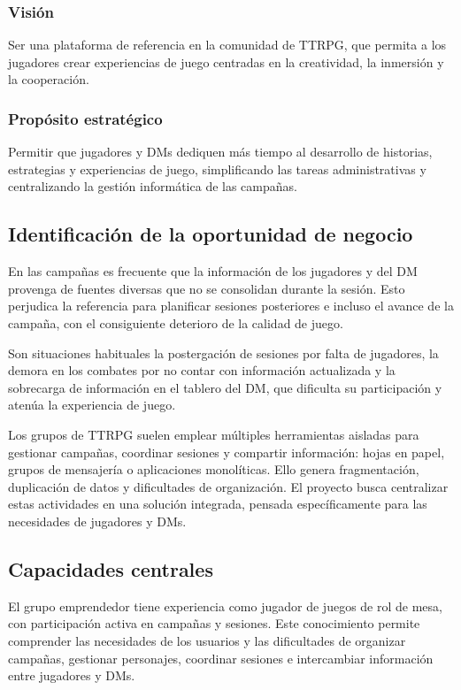 \subsubsection{Visión}
Ser una plataforma de referencia en la comunidad de TTRPG, que permita a los jugadores crear experiencias de juego centradas en la creatividad, la inmersión y la cooperación.

\subsubsection{Propósito estratégico}
Permitir que jugadores y DMs dediquen más tiempo al desarrollo de historias, estrategias y experiencias de juego, simplificando las tareas administrativas y centralizando la gestión informática de las campañas.

\subsection{Identificación de la oportunidad de negocio}
En las campañas es frecuente que la información de los jugadores y del DM provenga de fuentes diversas que no se consolidan durante la sesión. Esto perjudica la referencia para planificar sesiones posteriores e incluso el avance de la campaña, con el consiguiente deterioro de la calidad de juego.

Son situaciones habituales la postergación de sesiones por falta de jugadores, la demora en los combates por no contar con información actualizada y la sobrecarga de información en el tablero del DM, que dificulta su participación y atenúa la experiencia de juego.

Los grupos de TTRPG suelen emplear múltiples herramientas aisladas para gestionar campañas, coordinar sesiones y compartir información: hojas en papel, grupos de mensajería o aplicaciones monolíticas. Ello genera fragmentación, duplicación de datos y dificultades de organización. El proyecto busca centralizar estas actividades en una solución integrada, pensada específicamente para las necesidades de jugadores y DMs.

\subsection{Capacidades centrales}
El grupo emprendedor tiene experiencia como jugador de juegos de rol de mesa, con participación activa en campañas y sesiones. Este conocimiento permite comprender las necesidades de los usuarios y las dificultades de organizar campañas, gestionar personajes, coordinar sesiones e intercambiar información entre jugadores y DMs.

